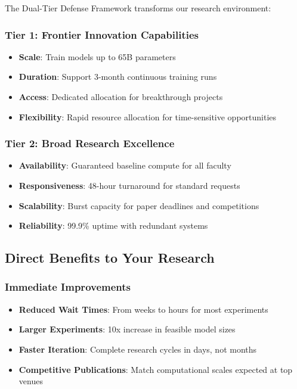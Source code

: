 The Dual-Tier Defense Framework transforms our research environment:

\subsubsection{Tier 1: Frontier Innovation Capabilities}
\begin{itemize}
\item \textbf{Scale}: Train models up to 65B parameters
\item \textbf{Duration}: Support 3-month continuous training runs
\item \textbf{Access}: Dedicated allocation for breakthrough projects
\item \textbf{Flexibility}: Rapid resource allocation for time-sensitive opportunities
\end{itemize}

\subsubsection{Tier 2: Broad Research Excellence}
\begin{itemize}
\item \textbf{Availability}: Guaranteed baseline compute for all faculty
\item \textbf{Responsiveness}: 48-hour turnaround for standard requests
\item \textbf{Scalability}: Burst capacity for paper deadlines and competitions
\item \textbf{Reliability}: 99.9\% uptime with redundant systems
\end{itemize}

\subsection{Direct Benefits to Your Research}

\subsubsection{Immediate Improvements}
\begin{itemize}
\item \textbf{Reduced Wait Times}: From weeks to hours for most experiments
\item \textbf{Larger Experiments}: 10x increase in feasible model sizes
\item \textbf{Faster Iteration}: Complete research cycles in days, not months
\item \textbf{Competitive Publications}: Match computational scales expected at top venues
\end{itemize}

